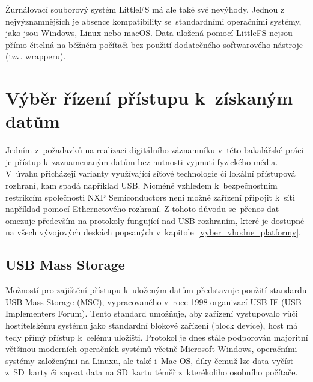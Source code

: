 Žurnálovací souborový systém LittleFS má ale také své nevýhody. Jednou z nejvýznamnějších je absence kompatibility se~standardními operačními systémy, jako jsou Windows, Linux nebo macOS. Data uložená pomocí LittleFS nejsou přímo čitelná na běžném počítači bez použití dodatečného softwarového nástroje (tzv. wrapperu).\cite{cnx_software_little_fs}



\section{Výběr řízení přístupu k~získaným datům}
\label{vyber_rizeni_pristupu_k_ziskanym_datum}
Jedním z~požadavků na realizaci digitálního záznamníku v~této bakalářské práci je přístup k~zaznamenaným datům bez nutnosti vyjmutí fyzického média. V~úvahu přicházejí varianty využívající síťové technologie či lokální přístupová rozhraní, kam spadá například USB. Nicméně vzhledem k~bezpečnostním restrikcím společnosti NXP Semiconductors není možné zařízení připojit k~síti například pomocí Ethernetového rozhraní. Z tohoto důvodu se~přenos dat omezuje především na protokoly fungující nad USB rozhraním, které je dostupné na všech vývojových deskách popsaných v~kapitole~\ref{vyber_vhodne_platformy}.


\subsection{USB Mass Storage}
\label{usb_mass_storage}
Možností pro zajištění přístupu k~uloženým datům představuje použití standardu USB Mass Storage (MSC), vypracovaného v~roce 1998 organizací USB-IF (USB Implementers Forum). Tento standard umožňuje, aby zařízení vystupovalo vůči hostitelskému systému jako standardní blokové zařízení (block device), host má tedy přímý přístup k~celému uložišti. Protokol je dnes stále podporován majoritní většinou moderních operačních systémů včetně Microsoft Windows, operačními systémy založenými na Linuxu, ale také i~Mac OS, díky čemuž lze data vyčíst z~SD~karty či zapsat data na SD~kartu téměř z~kterékoliho osobního počítače.~\cite{usb_standard_ufi, silicon_labs_mass_storage_protocol}

